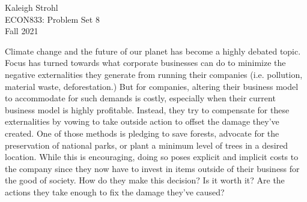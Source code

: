 \documentclass[12pt]{article}
\begin{document}
\begin{center}
Kaleigh Strohl \\
ECON833: Problem Set 8 \\
Fall 2021
\end{center}

Climate change and the future of our planet has become a highly debated topic. Focus has turned towards what corporate businesses can do to minimize the negative externalities they generate from running their companies (i.e. pollution, material waste, deforestation.) But for companies, altering their business model to accommodate for such demands is costly, especially when their current business model is highly profitable. Instead, they try to compensate for these externalities by vowing to take outside action to offset the damage they've created. One of those methods is pledging to save forests, advocate for the preservation of national parks, or plant a minimum level of trees in a desired location. While this is encouraging, doing so poses explicit and implicit costs to the company since they now have to invest in items outside of their business for the good of society. How do they make this decision? Is it worth it? Are the actions they take enough to fix the damage they've caused?
\end{document}
